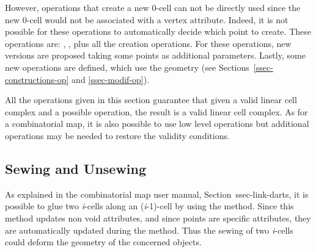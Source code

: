 However, operations that create a new 0-cell can not be directly used
since the new 0-cell would not be associated with a vertex
attribute. Indeed, it is not possible for these operations to
automatically decide which point to create. These operations are:
, 
, plus all the creation
operations. For these operations, new versions are proposed taking
some points as additional parameters.  Lastly, some new operations are
defined, which use the geometry (see Sections~\ref{ssec-constructions-op} and
\ref{ssec-modif-op}).

All the operations given in this section guarantee that given a valid
linear cell complex and a possible operation, the result is a valid
linear cell complex. As for a combinatorial map, it is also possible
to use low level operations but additional operations may be needed to
restore the validity conditions.

\subsection{Sewing and Unsewing \label{ssec-lcc-link-darts}}

As explained in the combinatorial map user manual,
Section~{ssec-link-darts}, it is possible to glue two \emph{i}-cells
along an (\emph{i}-1)-cell by using the  method. Since
this method updates non void attributes, and since points are specific
attributes, they are automatically updated during the 
method. Thus the sewing of two \emph{i}-cells could deform the
geometry of the concerned objects.

